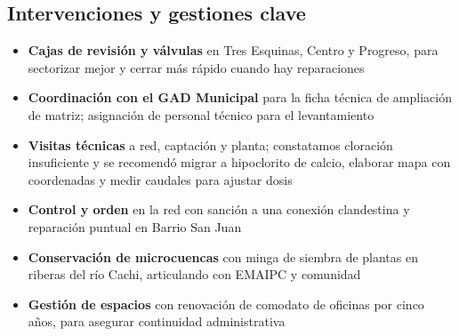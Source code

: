 \subsection*{Intervenciones y gestiones clave}
\begin{itemize}[noitemsep, topsep=0pt]
  \item \textbf{Cajas de revisión y válvulas} en Tres Esquinas, Centro y Progreso, para sectorizar mejor y cerrar más rápido cuando hay reparaciones
  \item \textbf{Coordinación con el GAD Municipal} para la ficha técnica de ampliación de matriz; asignación de personal técnico para el levantamiento
  \item \textbf{Visitas técnicas} a red, captación y planta; constatamos cloración insuficiente y se recomendó migrar a hipoclorito de calcio, elaborar mapa con coordenadas y medir caudales para ajustar dosis
  \item \textbf{Control y orden} en la red con sanción a una conexión clandestina y reparación puntual en Barrio San Juan
  \item \textbf{Conservación de microcuencas} con minga de siembra de plantas en riberas del río Cachi, articulando con EMAIPC y comunidad
  \item \textbf{Gestión de espacios} con renovación de comodato de oficinas por cinco años, para asegurar continuidad administrativa
\end{itemize}


